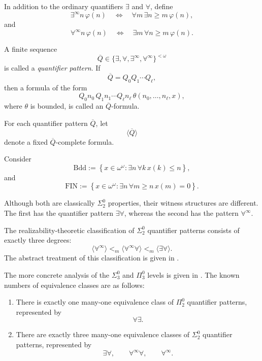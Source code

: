 \documentclass[11pt]{amsart}
\theoremstyle{definition}
\begin{document}
{In addition to the ordinary quantifiers $\exists$ and $\forall$, define
\[
    \exists^\infty n\,\varphi(n)
    \quad\Longleftrightarrow\quad
    \forall m\,\exists n\geq m\,\varphi(n),
\]
and
\[
    \forall^\infty n\,\varphi(n)
    \quad\Longleftrightarrow\quad
    \exists m\,\forall n\geq m\,\varphi(n).
\]

A finite sequence
\[
    \overline{Q}
    \in
    \{\exists,\forall,\exists^\infty,\forall^\infty\}^{<\omega}
\]
is called a \emph{quantifier pattern}. If
\[
    \overline{Q}=Q_0Q_1\cdots Q_\ell,
\]
then a formula of the form
\[
    Q_0n_0\,Q_1n_1\cdots Q_\ell n_\ell\,
    \theta(n_0,\ldots,n_\ell,x),
\]
where $\theta$ is bounded, is called an
$\overline{Q}$-formula.

For each quantifier pattern $\overline{Q}$, let
\[
    \langle\overline{Q}\rangle
\]
denote a fixed $\overline{Q}$-complete formula.

Consider
\[
    \mathrm{Bdd}
    :=
    \left\{
        x\in\omega^\omega:
        \exists n\,\forall k\,
        x(k)\leq n
    \right\},
\]
and
\[
    \mathrm{FIN}
    :=
    \left\{
        x\in\omega^\omega:
        \exists n\,\forall m\geq n\,
        x(m)=0
    \right\}.
\]

Although both are classically $\Sigma^0_2$ properties, their witness
structures are different. The first has the quantifier pattern
$\exists\forall$, whereas the second has the pattern
$\forall^\infty$.

The realizability-theoretic classification of
$\Sigma^0_2$ quantifier patterns consists of exactly three degrees:
\[
    \langle\forall^\infty\rangle
    <_m
    \langle\forall^\infty\forall\rangle
    <_m
    \langle\exists\forall\rangle.
\]
The abstract treatment of this classification is given in
\cite{KiharaManyOne}.

The more concrete analysis of the $\Sigma^0_3$ and $\Pi^0_3$ levels is
given in \cite{KiharaHierarchy}. The known numbers of equivalence
classes are as follows:
\begin{enumerate}
    \item[(1)] There is exactly one many-one equivalence class of $\Pi^0_2$ quantifier patterns,
    represented by
    \[
        \forall\exists.
    \]

    \item[(2)] There are exactly three many-one equivalence classes of $\Sigma^0_2$ quantifier
    patterns, represented by
    \[
        \exists\forall,\qquad
        \forall^\infty\forall,\qquad
        \forall^\infty.
    \]


\end{enumerate}}
\end{document}
